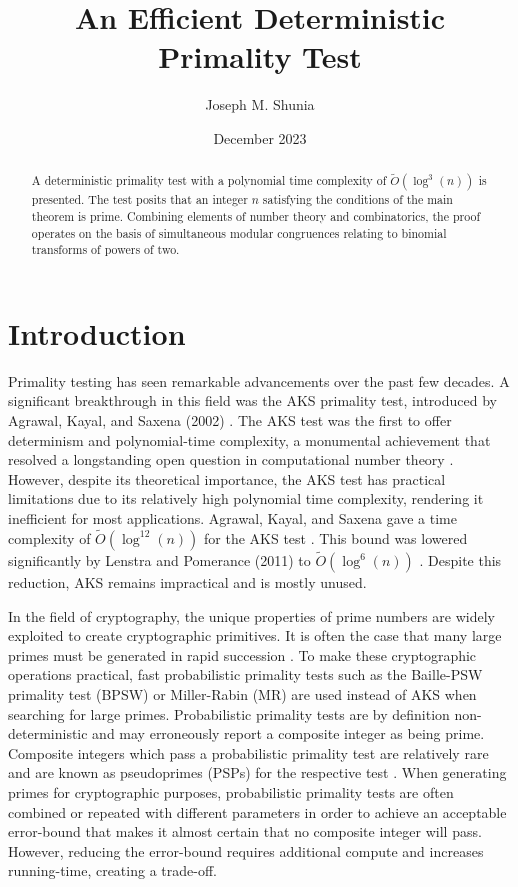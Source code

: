\documentclass{article}
\title{An Efficient Deterministic Primality Test}
\author{Joseph M. Shunia}
\date{December 2023}
\theoremstyle{plain}
\theoremstyle{definition}
\begin{document}
\maketitle

\begin{abstract}
A deterministic primality test with a polynomial time complexity of $\tilde{O}(\log^3(n))$ is presented. The test posits that an integer $n$ satisfying the conditions of the main theorem is prime. Combining elements of number theory and combinatorics, the proof operates on the basis of simultaneous modular congruences relating to binomial transforms of powers of two.
\end{abstract}

\section{Introduction}

Primality testing has seen remarkable advancements over the past few decades. A significant breakthrough in this field was the AKS primality test, introduced by Agrawal, Kayal, and Saxena (2002) \cite{aks2002}. The AKS test was the first to offer determinism and polynomial-time complexity, a monumental achievement that resolved a longstanding open question in computational number theory \cite{goldreich2008}. However, despite its theoretical importance, the AKS test has practical limitations due to its relatively high polynomial time complexity, rendering it inefficient for most applications. Agrawal, Kayal, and Saxena gave a time complexity of $\tilde{O}(\log^{12}(n))$ for the AKS test \cite{aks2002}. This bound was lowered significantly by Lenstra and Pomerance (2011) to $\tilde{O}(\log^6(n))$ \cite{lenstra2011}. Despite this reduction, AKS remains impractical and is mostly unused.

In the field of cryptography, the unique properties of prime numbers are widely exploited to create cryptographic primitives. It is often the case that many large primes must be generated in rapid succession \cite{lenstra1987}. To make these cryptographic operations practical, fast probabilistic primality tests such as the Baille-PSW primality test (BPSW) \cite{baillie1980} or Miller-Rabin (MR) \cite{rabin1980} \cite{miller1976} are used instead of AKS when searching for large primes. Probabilistic primality tests are by definition non-deterministic and may erroneously report a composite integer as being prime. Composite integers which pass a probabilistic primality test are relatively rare and are known as pseudoprimes (PSPs) for the respective test \cite{wagstaff1983}. When generating primes for cryptographic purposes, probabilistic primality tests are often combined or repeated with different parameters in order to achieve an acceptable error-bound that makes it almost certain that no composite integer will pass. However, reducing the error-bound requires additional compute and increases running-time, creating a trade-off.
\end{document}
